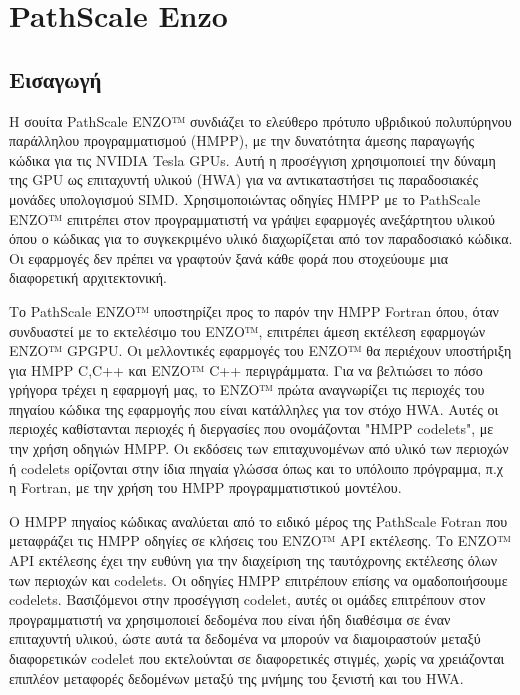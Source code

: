 \section{PathScale Enzo}
\subsection{Εισαγωγή}
Η σουίτα PathScale ENZO™ συνδιάζει το ελεύθερο πρότυπο υβριδικού πολυπύρηνου παράλληλου προγραμματισμού (HMPP), με την δυνατότητα άμεσης παραγωγής κώδικα για τις NVIDIA Tesla GPUs. Αυτή η προσέγγιση χρησιμοποιεί την δύναμη της GPU ως επιταχυντή υλικού (HWA) για να αντικαταστήσει τις παραδοσιακές μονάδες υπολογισμού SIMD. Χρησιμοποιώντας οδηγίες HMPP με το PathScale ENZO™ επιτρέπει στον προγραμματιστή να γράψει εφαρμογές ανεξάρτητου υλικού όπου ο κώδικας για το συγκεκριμένο υλικό διαχωρίζεται από τον παραδοσιακό κώδικα. Οι εφαρμογές δεν πρέπει να γραφτούν ξανά κάθε φορά που στοχεύουμε μια διαφορετική αρχιτεκτονική. 

Το PathScale ENZO™ υποστηρίζει προς το παρόν την HMPP Fortran όπου, όταν συνδυαστεί με το εκτελέσιμο του ENZO™, επιτρέπει άμεση εκτέλεση εφαρμογών ENZO™ GPGPU. Οι μελλοντικές εφαρμογές του ENZO™ θα περιέχουν υποστήριξη για HMPP C,C++ και ENZO™ C++ περιγράμματα. Για να βελτιώσει το πόσο γρήγορα τρέχει η εφαρμογή μας, το ENZO™ πρώτα αναγνωρίζει τις περιοχές του πηγαίου κώδικα της εφαρμογής που είναι κατάλληλες για τον στόχο HWA. Αυτές οι περιοχές καθίστανται περιοχές ή διεργασίες που ονομάζονται "HMPP codelets", με την χρήση οδηγιών HMPP. Οι εκδόσεις των επιταχυνομένων από υλικό των περιοχών ή codelets ορίζονται στην ίδια πηγαία γλώσσα όπως και το υπόλοιπο πρόγραμμα, π.χ η Fortran, με την χρήση του HMPP προγραμματιστικού μοντέλου.

Ο HMPP πηγαίος κώδικας αναλύεται από το ειδικό μέρος της PathScale Fotran που μεταφράζει τις HMPP οδηγίες σε κλήσεις του ENZO™ API εκτέλεσης. Το ENZO™ API εκτέλεσης έχει την ευθύνη για την διαχείριση της ταυτόχρονης εκτέλεσης όλων των περιοχών και codelets. Οι οδηγίες HMPP επιτρέπουν επίσης να ομαδοποιήσουμε codelets. Βασιζόμενοι στην προσέγγιση codelet, αυτές οι ομάδες επιτρέπουν στον προγραμματιστή να χρησιμοποιεί δεδομένα που είναι ήδη διαθέσιμα σε έναν επιταχυντή υλικού, ώστε αυτά τα δεδομένα να μπορούν να διαμοιραστούν μεταξύ διαφορετικών codelet που εκτελούνται σε διαφορετικές στιγμές, χωρίς να χρειάζονται επιπλέον μεταφορές δεδομένων μεταξύ της μνήμης του ξενιστή και του HWA.